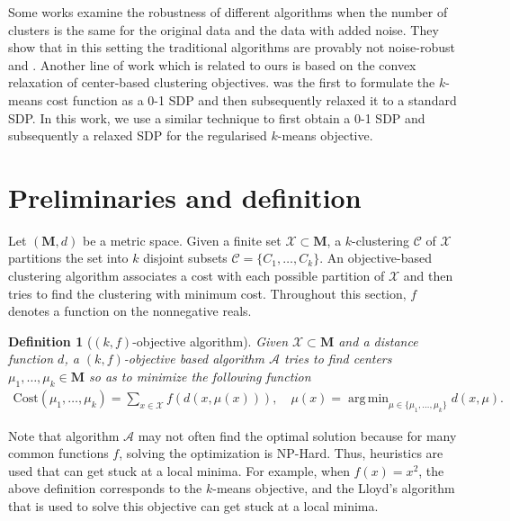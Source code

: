 \documentclass[12pt]{article}
\newcommand{\mc}{\mathcal}
\newcommand{\mb}{\mathbf}
\DeclareMathOperator*{\argmin}{arg\,min}
\newtheorem{definition}[theorem]{Definition}
\begin{document}

Some works examine the robustness of different algorithms when the number of clusters is the same for the original data and the data with added noise. They show that in this setting the traditional algorithms are provably not noise-robust \cite{hennig2008dissolution} and \cite{ackerman2013clustering}. Another line of work which is related to ours is based on the convex relaxation of center-based clustering objectives. \cite{peng2007approximating} was the first to formulate the $k$-means cost function as a 0-1 SDP and then subsequently relaxed it to a standard SDP. In this work, we use a similar technique to first obtain a 0-1 SDP and subsequently a relaxed SDP for the regularised $k$-means objective. 

\section{Preliminaries and definition}
\label{sec:pre}

Let $(\mb M, d)$ be a metric space. Given a finite set $\mc X \subset \mb M$, a $k$-clustering $\mc C$ of $\mc X$ partitions the set into $k$ disjoint subsets $\mc C = \{C_1, \ldots, C_k\}$. An objective-based clustering algorithm associates a cost with each possible partition of $\mc X$ and then tries to find the clustering with minimum cost. Throughout this section, $f$ denotes a function on the nonnegative reals.

\begin{definition}[$(k, f)$-objective algorithm] Given $\mc X\subset \mb M$ and a distance function $d$, a $(k, f)$-objective based algorithm $\mc A$ tries to find centers $\mu_1, \ldots, \mu_k \in \mb M$ so as to minimize the following function
\begin{align}
\label{eqn:kfObjectiveAlg}
\text{Cost}(\mu_1, \ldots, \mu_k) = \sum_{x\in \mc X} f(d(x, \mu(x))), \quad \mu(x) = \argmin_{\mu \in \{\mu_1, \ldots, \mu_k\}} d(x, \mu).
\end{align}
\end{definition}
Note that algorithm $\mc A$ may not often find the optimal solution because for many common functions $f$, solving the optimization is NP-Hard. Thus, heuristics are used that can get stuck at a local minima. For example, when $f(x) = x^2$, the above definition corresponds to the $k$-means objective, and the Lloyd's algorithm that is used to solve this objective can get stuck at a local minima. 
\end{document}
